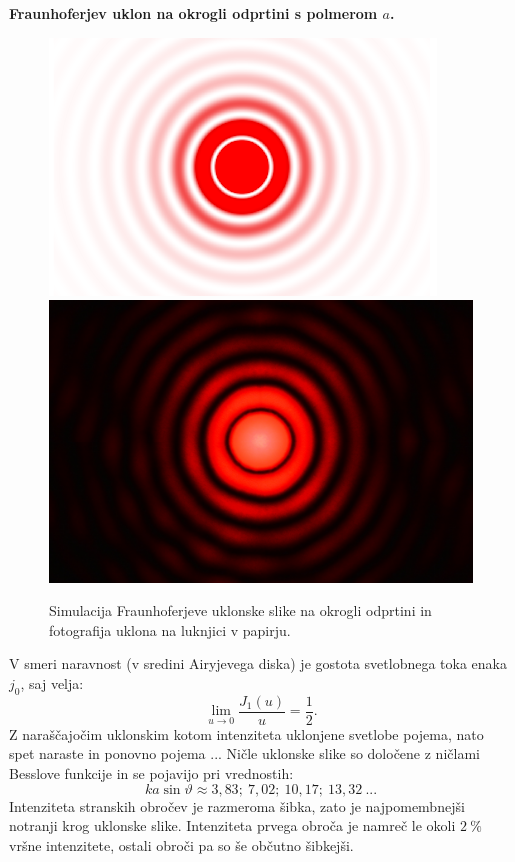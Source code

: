 \begin{example}{\bf Fraunhoferjev uklon na okrogli odprtini s polmerom $a$.}
\begin{figure}[ht]
\includegraphics[width=7truecm]{slike/05_circ_sim.png}\hfill
\includegraphics[width=7truecm]{slike/05_circ.JPG}
\caption{Simulacija Fraunhoferjeve uklonske slike na okrogli odprtini in fotografija
uklona na luknjici v papirju.}
\label{fig:05_Airy}
\end{figure}

V smeri naravnost (v sredini Airyjevega diska) 
je gostota svetlobnega toka enaka $j_0$, saj velja:
\begin{equation}
\lim_{u \to 0}\frac{J_1(u)}{u} = \frac{1}{2}.
\label{eq:05_39}
\end{equation}
Z naraščajočim uklonskim kotom intenziteta uklonjene svetlobe pojema, nato
spet naraste in ponovno pojema ... Ničle uklonske slike so določene
z ničlami Besslove funkcije in se pojavijo pri vrednostih:
\begin{equation}
ka\sin\vartheta  \approx 3,83;~7,02;~10,17;~13,32~...
\label{eq:05_40}
\end{equation}
Intenziteta stranskih obročev je razmeroma šibka, zato je najpomembnejši
notranji krog uklonske slike. Intenziteta prvega obroča je namreč le okoli $2~\%$ vršne
intenzitete, ostali obroči pa so še občutno šibkejši.


\end{example}
